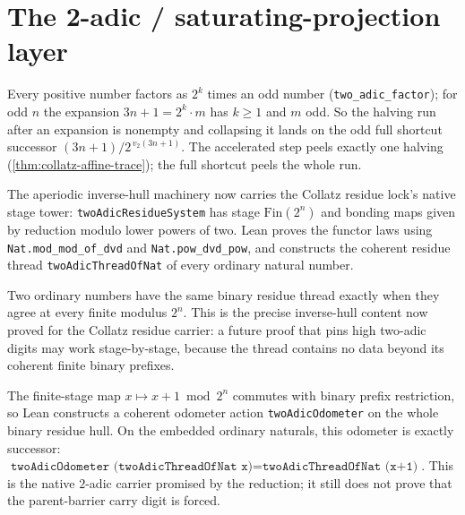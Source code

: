 \section{The 2-adic / saturating-projection layer}

\begin{theorem}
  \label{thm:collatz-saturating-depth}
  \leanok
  Every positive number factors as $2^k$ times an odd number
  (\texttt{two\_adic\_factor}); for odd $n$ the expansion $3n+1=2^k\cdot m$ has $k\ge1$ and $m$
  odd. So the halving run after an expansion is nonempty and collapsing it lands on the odd full
  shortcut successor $(3n+1)/2^{\,v_2(3n+1)}$. The accelerated step peels exactly one
  halving (\cref{thm:collatz-affine-trace}); the full shortcut peels the whole run.
\end{theorem}
\begin{theorem}
  \label{thm:collatz-two-adic-lock}
  \leanok
  The aperiodic inverse-hull machinery now carries the Collatz residue lock's native
  stage tower: \texttt{twoAdicResidueSystem} has stage \(\mathrm{Fin}(2^n)\) and
  bonding maps given by reduction modulo lower powers of two. Lean proves the functor
  laws using \texttt{Nat.mod\_mod\_of\_dvd} and \texttt{Nat.pow\_dvd\_pow}, and
  constructs the coherent residue thread \texttt{twoAdicThreadOfNat} of every ordinary
  natural number.
\end{theorem}
\begin{theorem}
  \label{thm:collatz-two-adic-stage-separated}
  \leanok
  Two ordinary numbers have the same binary residue thread exactly when they agree
  at every finite modulus \(2^n\). This is the precise inverse-hull content now
  proved for the Collatz residue carrier: a future proof that pins high two-adic
  digits may work stage-by-stage, because the thread contains no data beyond its
  coherent finite binary prefixes.
\end{theorem}
\begin{theorem}
  \label{thm:collatz-two-adic-odometer}
  \leanok
  The finite-stage map \(x\mapsto x+1 \bmod 2^n\) commutes with binary prefix
  restriction, so Lean constructs a coherent odometer action
  \texttt{twoAdicOdometer} on the whole binary residue hull. On the embedded
  ordinary naturals, this odometer is exactly successor:
  \(\texttt{twoAdicOdometer (twoAdicThreadOfNat x)}
    = \texttt{twoAdicThreadOfNat (x+1)}\).
  This is the native \(2\)-adic carrier promised by the reduction; it still does
  not prove that the parent-barrier carry digit is forced.
\end{theorem}
